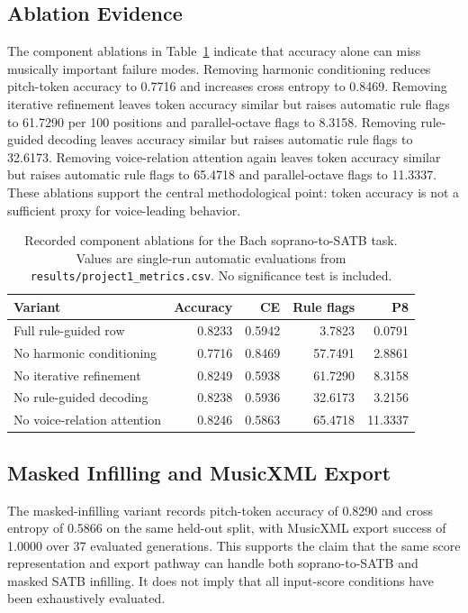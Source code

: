 \documentclass[11pt]{article}
\begin{document}
\subsection{Ablation Evidence}

The component ablations in Table~\ref{tab:ablations} indicate that accuracy alone can miss musically important failure modes. Removing harmonic conditioning reduces pitch-token accuracy to 0.7716 and increases cross entropy to 0.8469. Removing iterative refinement leaves token accuracy similar but raises automatic rule flags to 61.7290 per 100 positions and parallel-octave flags to 8.3158. Removing rule-guided decoding leaves accuracy similar but raises automatic rule flags to 32.6173. Removing voice-relation attention again leaves token accuracy similar but raises automatic rule flags to 65.4718 and parallel-octave flags to 11.3337. These ablations support the central methodological point: token accuracy is not a sufficient proxy for voice-leading behavior.

\begin{table}[t]
\centering
\caption{Recorded component ablations for the Bach soprano-to-SATB task. Values are single-run automatic evaluations from \texttt{results/project1\_metrics.csv}. No significance test is included.}
\label{tab:ablations}
\begin{tabular}{lrrrr}
\toprule
Variant & Accuracy & CE & Rule flags & P8 \\
\midrule
Full rule-guided row & 0.8233 & 0.5942 & 3.7823 & 0.0791 \\
No harmonic conditioning & 0.7716 & 0.8469 & 57.7491 & 2.8861 \\
No iterative refinement & 0.8249 & 0.5938 & 61.7290 & 8.3158 \\
No rule-guided decoding & 0.8238 & 0.5936 & 32.6173 & 3.2156 \\
No voice-relation attention & 0.8246 & 0.5863 & 65.4718 & 11.3337 \\
\bottomrule
\end{tabular}
\end{table}

\subsection{Masked Infilling and MusicXML Export}

The masked-infilling variant records pitch-token accuracy of 0.8290 and cross entropy of 0.5866 on the same held-out split, with MusicXML export success of 1.0000 over 37 evaluated generations. This supports the claim that the same score representation and export pathway can handle both soprano-to-SATB and masked SATB infilling. It does not imply that all input-score conditions have been exhaustively evaluated.
\end{document}
